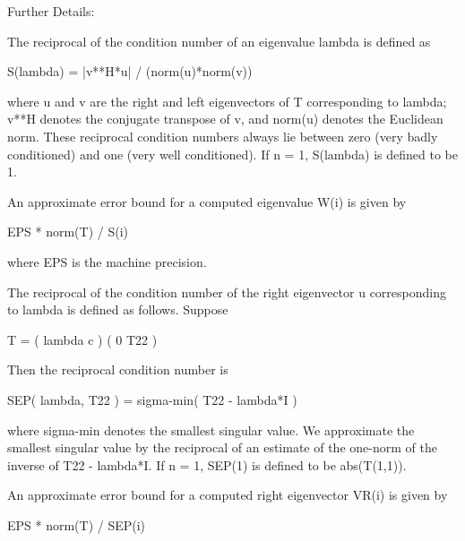 \begin{DoxyParagraph}{Further Details\+: }
\begin{DoxyVerb}  The reciprocal of the condition number of an eigenvalue lambda is
  defined as

          S(lambda) = |v**H*u| / (norm(u)*norm(v))

  where u and v are the right and left eigenvectors of T corresponding
  to lambda; v**H denotes the conjugate transpose of v, and norm(u)
  denotes the Euclidean norm. These reciprocal condition numbers always
  lie between zero (very badly conditioned) and one (very well
  conditioned). If n = 1, S(lambda) is defined to be 1.

  An approximate error bound for a computed eigenvalue W(i) is given by

                      EPS * norm(T) / S(i)

  where EPS is the machine precision.

  The reciprocal of the condition number of the right eigenvector u
  corresponding to lambda is defined as follows. Suppose

              T = ( lambda  c  )
                  (   0    T22 )

  Then the reciprocal condition number is

          SEP( lambda, T22 ) = sigma-min( T22 - lambda*I )

  where sigma-min denotes the smallest singular value. We approximate
  the smallest singular value by the reciprocal of an estimate of the
  one-norm of the inverse of T22 - lambda*I. If n = 1, SEP(1) is
  defined to be abs(T(1,1)).

  An approximate error bound for a computed right eigenvector VR(i)
  is given by

                      EPS * norm(T) / SEP(i)\end{DoxyVerb}
 
\end{DoxyParagraph}
